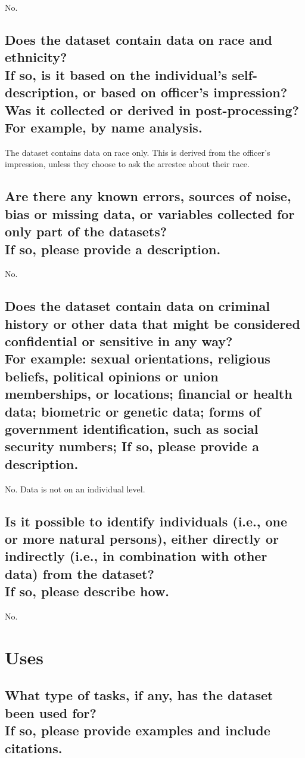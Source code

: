 \documentclass[letterpaper, 10 pt, conference]{ieeeconf}  %
\newcommand{\subtitle}[1]{{\\ \small \normalfont \color{purple} #1}}
\begin{document}
No.

\subsection{Does the dataset contain data on race and ethnicity? \subtitle{If so, is it based on the individual's self-description, or based on officer's impression? Was it collected or derived in post-processing? For example, by name analysis.}}

The dataset contains data on race only. This is derived from the officer's impression, unless they choose to ask the arrestee about their race. 

\subsection{Are there any known errors, sources of noise, bias or missing data, or variables collected for only part of the datasets? \subtitle{If so, please provide a description.}}

No. 

\subsection{Does the dataset contain data on criminal history or other data that might be considered confidential or sensitive in any way? \subtitle{For example: sexual orientations, religious beliefs, political opinions or union memberships, or locations; financial or health data; biometric or genetic data; forms of government identification, such as social security numbers; If so, please provide a description.}}

No. Data is not on an individual level. 

\subsection{Is it possible to identify individuals (i.e., one or more natural persons), either directly or indirectly (i.e., in combination with other data) from the dataset? \subtitle{If so, please describe how.}}

No.

\section{Uses}

\subsection{What type of tasks, if any, has the dataset been used for? \subtitle{If so, please provide examples and include citations.}}
\end{document}
